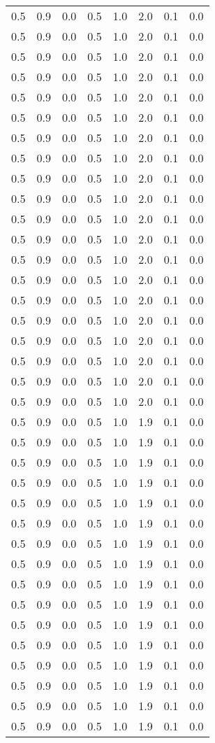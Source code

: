 \begin{tabular}{L{1in}|L{1in}|L{1in}|L{1in}|L{1in}|L{1in}|L{1in}|L{1in}}
0.5&0.9&0.0&0.5&1.0&2.0&0.1&0.0\\
0.5&0.9&0.0&0.5&1.0&2.0&0.1&0.0\\
0.5&0.9&0.0&0.5&1.0&2.0&0.1&0.0\\
0.5&0.9&0.0&0.5&1.0&2.0&0.1&0.0\\
0.5&0.9&0.0&0.5&1.0&2.0&0.1&0.0\\
0.5&0.9&0.0&0.5&1.0&2.0&0.1&0.0\\
0.5&0.9&0.0&0.5&1.0&2.0&0.1&0.0\\
0.5&0.9&0.0&0.5&1.0&2.0&0.1&0.0\\
0.5&0.9&0.0&0.5&1.0&2.0&0.1&0.0\\
0.5&0.9&0.0&0.5&1.0&2.0&0.1&0.0\\
0.5&0.9&0.0&0.5&1.0&2.0&0.1&0.0\\
0.5&0.9&0.0&0.5&1.0&2.0&0.1&0.0\\
0.5&0.9&0.0&0.5&1.0&2.0&0.1&0.0\\
0.5&0.9&0.0&0.5&1.0&2.0&0.1&0.0\\
0.5&0.9&0.0&0.5&1.0&2.0&0.1&0.0\\
0.5&0.9&0.0&0.5&1.0&2.0&0.1&0.0\\
0.5&0.9&0.0&0.5&1.0&2.0&0.1&0.0\\
0.5&0.9&0.0&0.5&1.0&2.0&0.1&0.0\\
0.5&0.9&0.0&0.5&1.0&2.0&0.1&0.0\\
0.5&0.9&0.0&0.5&1.0&2.0&0.1&0.0\\
0.5&0.9&0.0&0.5&1.0&1.9&0.1&0.0\\
0.5&0.9&0.0&0.5&1.0&1.9&0.1&0.0\\
0.5&0.9&0.0&0.5&1.0&1.9&0.1&0.0\\
0.5&0.9&0.0&0.5&1.0&1.9&0.1&0.0\\
0.5&0.9&0.0&0.5&1.0&1.9&0.1&0.0\\
0.5&0.9&0.0&0.5&1.0&1.9&0.1&0.0\\
0.5&0.9&0.0&0.5&1.0&1.9&0.1&0.0\\
0.5&0.9&0.0&0.5&1.0&1.9&0.1&0.0\\
0.5&0.9&0.0&0.5&1.0&1.9&0.1&0.0\\
0.5&0.9&0.0&0.5&1.0&1.9&0.1&0.0\\
0.5&0.9&0.0&0.5&1.0&1.9&0.1&0.0\\
0.5&0.9&0.0&0.5&1.0&1.9&0.1&0.0\\
0.5&0.9&0.0&0.5&1.0&1.9&0.1&0.0\\
0.5&0.9&0.0&0.5&1.0&1.9&0.1&0.0\\
0.5&0.9&0.0&0.5&1.0&1.9&0.1&0.0\\
0.5&0.9&0.0&0.5&1.0&1.9&0.1&0.0\\

\end{tabular}

